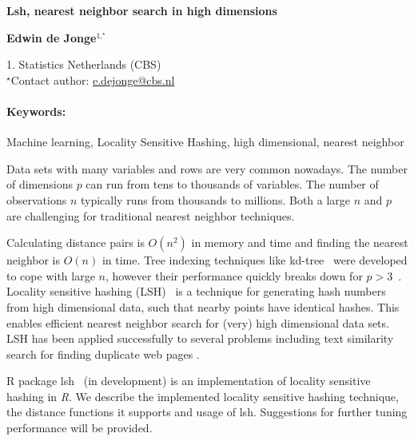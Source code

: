 \documentclass[11pt, a4paper]{article}
\newcommand{\pkg}[1]{{\normalfont\fontseries{b}\selectfont #1}}
\let\proglang=\textit
\let\code=\texttt
\renewcommand{\title}[1]{\begin{center}{\bf \LARGE #1}\end{center}}
\newcommand{\keywords}{\paragraph{Keywords:}}
\begin{document}
\pagestyle{empty}

\title{Lsh, nearest neighbor search in high dimensions}

\begin{center}
  {\bf Edwin de Jonge$^{1,^\star}$}
\end{center}

\begin{affiliations}
1. Statistics Netherlands (CBS) \\[-2pt]
$^\star$Contact author: \href{mailto:e.dejonge@cbs.nl}{e.dejonge@cbs.nl}\\
\end{affiliations}

\keywords Machine learning, Locality Sensitive Hashing, high dimensional, nearest neighbor 

\vskip 0.8cm

Data sets with many variables and rows are very common nowadays. The number of dimensions $p$ can run from tens to thousands of variables. The number of observations $n$ typically runs from thousands to millions.
Both a large $n$ and $p$ are challenging for traditional nearest neighbor techniques.

Calculating distance pairs is $O(n^2)$ in memory and time and finding the nearest neighbor is $O(n)$ in time.
Tree indexing techniques like kd-tree~\citep{bentley1975} were developed to cope with large $n$, however their performance quickly breaks down for $p > 3$~\citep{datar2004}. Locality sensitive hashing (LSH)~\citep{datar2004} is a technique for generating hash numbers from high dimensional data, such 
that nearby points have identical hashes. This enables efficient nearest neighbor search for (very) high dimensional data sets. LSH has been applied successfully to several problems including text similarity search for finding duplicate web pages \citep{slaney2008}.

R package \pkg{lsh}~\citep{dejonge2014} (in development) is an implementation of locality sensitive hashing in \proglang{R}. We describe the implemented locality sensitive hashing technique, the distance functions it supports and usage of \pkg{lsh}. Suggestions for further tuning performance will be provided.



\nocite{*}






\end{document}
